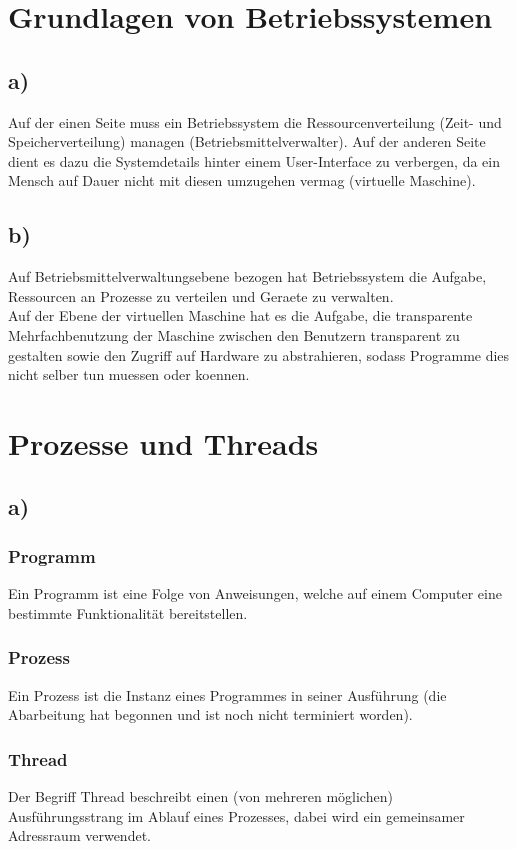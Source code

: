 \documentclass[a4paper,11pt]{scrartcl}
\title{\titleinfo}
\author{\authorinfo}
\begin{document}
\maketitle

\section*{Grundlagen von Betriebssystemen}
\subsection*{a)}
Auf der einen Seite muss ein Betriebssystem die Ressourcenverteilung (Zeit- und Speicherverteilung)
managen (Betriebsmittelverwalter). Auf der anderen Seite dient es dazu die Systemdetails hinter einem User-Interface zu verbergen,
da ein Mensch auf Dauer nicht mit diesen umzugehen vermag (virtuelle Maschine).
\subsection*{b)}
Auf Betriebsmittelverwaltungsebene bezogen hat Betriebssystem die Aufgabe, Ressourcen an Prozesse zu verteilen und Geraete zu verwalten.\\
Auf der Ebene der virtuellen Maschine hat es die Aufgabe, die transparente Mehrfachbenutzung der Maschine zwischen den Benutzern transparent zu gestalten sowie den Zugriff auf Hardware zu abstrahieren, sodass Programme dies nicht selber tun muessen oder koennen.


\section*{Prozesse und Threads}
\subsection*{a)} 
\subsubsection*{Programm}
Ein Programm ist eine Folge von Anweisungen, welche auf einem Computer eine bestimmte Funktionalität bereitstellen.
\subsubsection*{Prozess}
Ein Prozess ist die Instanz eines Programmes in seiner Ausführung (die Abarbeitung hat begonnen und ist noch nicht terminiert worden). 
\subsubsection*{Thread}
Der Begriff Thread beschreibt einen (von mehreren möglichen) Ausführungsstrang im Ablauf eines Prozesses, dabei wird ein gemeinsamer Adressraum verwendet.
\end{document}
